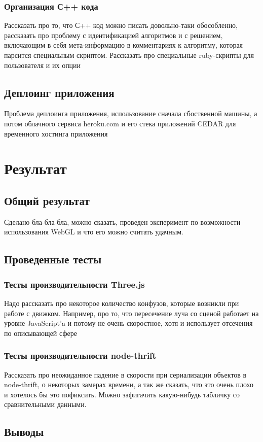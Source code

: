 \documentclass[12pt, a4paper]{article}
\let\stdsection\section
\renewcommand\section{\newpage\stdsection}
\begin{document}
\subsubsection{Организация С++ кода}
Рассказать про то, что С++ код можно писать довольно-таки обособленно,
рассказать про проблему с идентификацией алгоритмов и с решением, включающим в
себя мета-информацию в комментариях к алгоритму, которая парсится специальным
скриптом. Рассказать про специальные ruby-скрипты для пользователя и их опции

\subsection{Деплоинг приложения}
Проблема деплоинга приложения, использование сначала сбоственной машины, а потом
облачного сервиса heroku.com и его стека приложений CEDAR для временного
хостинга приложения


\section{Результат}
\subsection{Общий результат}
Сделано бла-бла-бла, можно сказать, проведен эксперимент по возможности
использования WebGL и что его можно считать удачным.
\subsection{Проведенные тесты}
\subsubsection{Тесты производительности Three.js}
Надо рассказать про некоторое количество конфузов, которые возникли при работе
с движком. Например, про то, что пересечение луча со сценой работает на уровне
JavaScript'a и потому не очень скоростное, хотя и использует отсечения по
описывающей сфере
\subsubsection{Тесты производительности node-thrift}
Рассказать про неожиданное падение в скорости при сериализации объектов в
node-thrift, о некоторых замерах времени, а так же сказать, что это очень плохо
и хотелось бы это пофиксить. Можно зафигачить какую-нибудь табличку со
сравнительными данными.
\subsection{Выводы}
\end{document}
